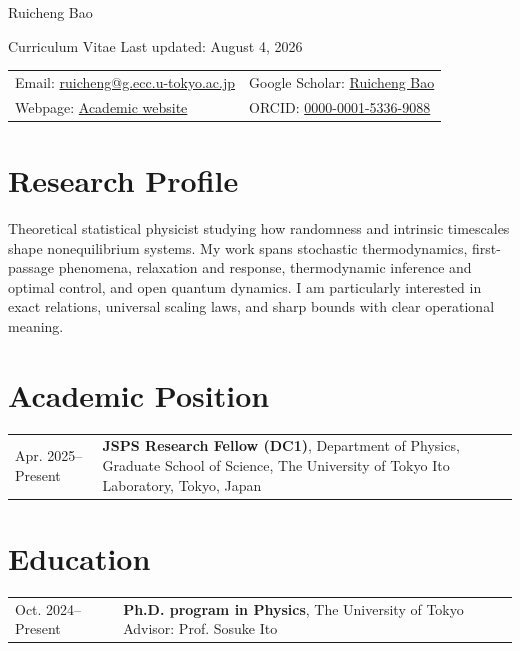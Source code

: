 \documentclass[10pt,a4paper]{article}
\makeatletter
\newcommand{\entry}[2]{%
  \begin{tabularx}{\textwidth}[t]{@{}>{\raggedright\arraybackslash}p{0.19\textwidth}>{\raggedright\arraybackslash}X@{}}
    \strut\color{muted}#1 & \strut#2
  \end{tabularx}\par
}
\makeatother
\begin{document}
\begin{center}
  {\fontsize{27}{31}\selectfont Ruicheng Bao}\par
  \vspace{0.25em}
  {\small\color{muted}Curriculum Vitae \enspace\textbar\enspace Last updated: August 4, 2026}
\end{center}

\vspace{0.65em}
\begin{tabularx}{\textwidth}{@{}>{\raggedright\arraybackslash}X >{\raggedleft\arraybackslash}X@{}}
  Email: \href{mailto:ruicheng@g.ecc.u-tokyo.ac.jp}{ruicheng@g.ecc.u-tokyo.ac.jp} &
  Google Scholar: \href{https://scholar.google.com/citations?user=ZSFCDtUAAAAJ}{Ruicheng Bao} \\
  Webpage: \href{https://ruichengbao.github.io/}{Academic website} &
  ORCID: \href{https://orcid.org/0000-0001-5336-9088}{0000-0001-5336-9088}
\end{tabularx}

\section{Research Profile}

Theoretical statistical physicist studying how randomness and intrinsic timescales shape nonequilibrium systems. My work spans stochastic thermodynamics, first-passage phenomena, relaxation and response, thermodynamic inference and optimal control, and open quantum dynamics. I am particularly interested in exact relations, universal scaling laws, and sharp bounds with clear operational meaning.

\section{Academic Position}

\entry{Apr. 2025--Present}{\textbf{JSPS Research Fellow (DC1)}, Department of Physics, Graduate School of Science, The University of Tokyo\newline
Ito Laboratory, Tokyo, Japan}

\section{Education}

\entry{Oct. 2024--Present}{\textbf{Ph.D. program in Physics}, The University of Tokyo\newline
Advisor: Prof. Sosuke Ito}
\end{document}
